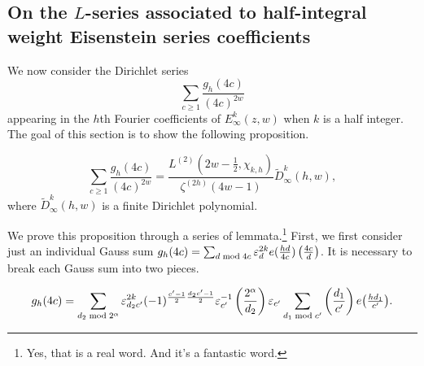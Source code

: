 \subsection*{On the $L$-series associated to half-integral weight Eisenstein series
coefficients}


We now consider the Dirichlet series
\begin{equation}
  \sum_{c \geq 1} \frac{g_h(4c)}{(4c)^{2w}}
\end{equation}
appearing in the $h$th Fourier coefficients of $E_\infty^k(z,w)$ when $k$ is a half
integer.
The goal of this section is to show the following proposition.


\begin{proposition}\label{prop:back:half_integral_L}
  \begin{equation}
    \sum_{c \geq 1} \frac{g_h(4c)}{(4c)^{2w}}
    =
    \frac{L^{(2)} (2w - \frac{1}{2}, \chi_{k,h})}{\zeta^{(2h)}(4w-1)}
    \widetilde{D}_\infty^k(h,w),
  \end{equation}
  where $\widetilde{D}_\infty^k(h,w)$ is a finite Dirichlet polynomial.
\end{proposition}


We prove this proposition through a series of lemmata.\footnote{Yes, that is a real word.
And it's a fantastic word.}
First, we first consider just an individual Gauss sum
$g_h(4c) = \sum_{d \bmod 4c} \varepsilon_d^{2k} e(\frac{hd}{4c}) \left(\frac{4c}{d}\right)$.
It is necessary to break each Gauss sum into two pieces.

\begin{lemma}\label{lem:back:gauss_two_pieces}
  \begin{equation}
    g_h(4c) = \sum_{d_2\bmod 2^\alpha} \varepsilon_{d_2c'}^{2k} (-1)^{\frac{c'-1}{2}
    \frac{d_2c'-1}{2}}\varepsilon_{c'}^{-1} \left(\frac{2^\alpha}{d_2}\right)
    \varepsilon_{c'}\sum_{d_1\bmod c'} \left(\frac{d_1}{c'}\right)  e\big( \tfrac{h d_1}{c'} \big).
  \end{equation}
\end{lemma}


